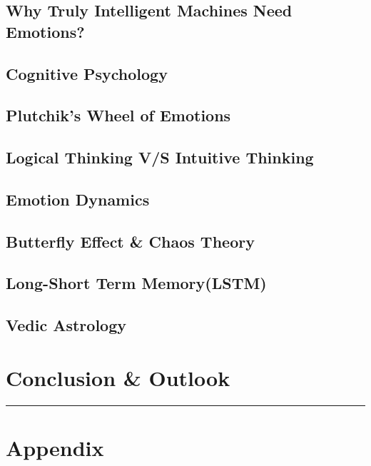 \documentclass[12pt, a4paper, twoside]{article}
\begin{document}
	\subsection{Why Truly Intelligent Machines Need Emotions?}
	
	\subsection{Cognitive Psychology}
	
	\subsection{Plutchik's Wheel of Emotions}
	
	\subsection{Logical Thinking V/S Intuitive Thinking}
	
	\subsection{Emotion Dynamics}
	
	\subsection{Butterfly Effect \& Chaos Theory}
	
	\subsection{Long-Short Term Memory(LSTM)}
	
	\subsection{Vedic Astrology}
	
	\section{Conclusion \& Outlook}
	
	\hrule
	
	
	\section*{Appendix}
	\appendix
	
\end{document}
